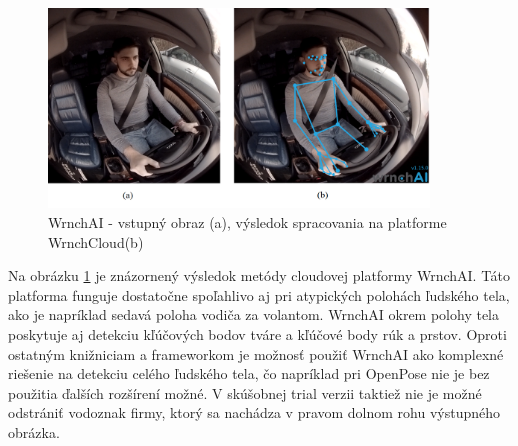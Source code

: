 \documentclass[slovak,master,dept460,male,cpp,cpdeclaration]{diploma}
\begin{document}
\begin{figure}[H]
	\centering
	\includegraphics[width=0.9\textwidth]{Figures/wrnchAI.png}
	\caption{WrnchAI - vstupný obraz (a), výsledok spracovania na platforme WrnchCloud(b)}
	\label{fig:wrnchAICloud}
\end{figure}

Na obrázku \ref{fig:wrnchAICloud} je znázornený výsledok metódy cloudovej platformy WrnchAI. Táto platforma  funguje dostatočne spoľahlivo aj pri atypických polohách ľudského tela, ako je napríklad sedavá poloha vodiča za volantom. WrnchAI okrem polohy tela poskytuje aj detekciu kľúčových bodov tváre a kľúčové body rúk a prstov. Oproti ostatným knižniciam a frameworkom je možnosť použiť WrnchAI ako komplexné riešenie na detekciu celého ľudského tela, čo napríklad pri OpenPose nie je bez použitia ďalších rozšírení možné. V skúšobnej trial verzii  taktiež nie je možné odstrániť vodoznak firmy, ktorý sa nachádza v pravom dolnom rohu výstupného obrázka.



\newpage
\end{document}
